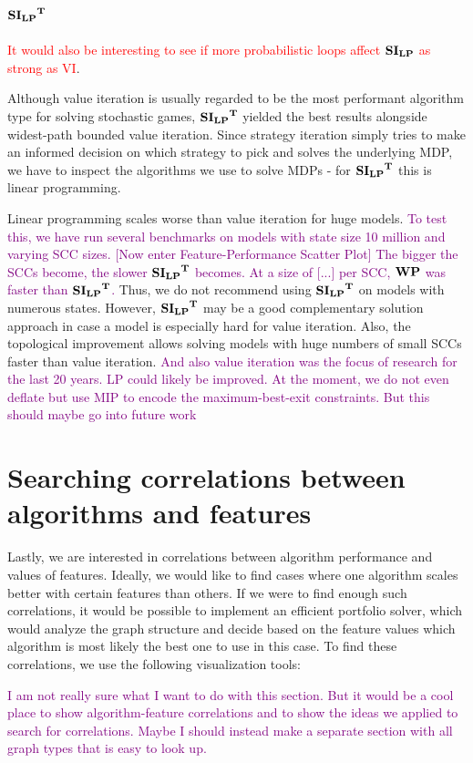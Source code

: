 \subsection{$\mathbf{\mathbf{SI_{LP}}^T}$}
\textcolor{red}{It would also be interesting to see if more probabilistic loops affect $\mathbf{SI_{LP}}$ as strong as VI}.

Although value iteration is usually regarded to be the most performant algorithm type for solving stochastic games, 
$\mathbf{\mathbf{SI_{LP}}^T}$ yielded the best results alongside widest-path bounded value iteration.
Since strategy iteration simply tries to make an informed decision on which strategy to pick and solves the underlying MDP, 
we have to inspect the algorithms we use to solve MDPs - for $\mathbf{\mathbf{SI_{LP}}^T}$ this is linear programming.

Linear programming scales worse than value iteration for huge models. \textcolor{purple}{To test this, we have 
run several benchmarks on models with state size 10 million and varying SCC sizes. [Now enter Feature-Performance Scatter Plot] 
The bigger the SCCs become, the slower $\mathbf{\mathbf{SI_{LP}}^T}$ becomes. At a size of [...] per SCC, $\mathbf{WP}$ was faster than $\mathbf{\mathbf{SI_{LP}}^T}$.}
Thus, we do not recommend using $\mathbf{\mathbf{SI_{LP}}^T}$ on models with numerous states.
However, $\mathbf{\mathbf{SI_{LP}}^T}$ may be a good complementary solution approach in case a model is especially hard for value iteration.
Also, the topological improvement allows solving models with huge numbers of small SCCs faster than value iteration.
\textcolor{purple}{And also value iteration was the focus of research for the last 20 years. 
LP could likely be improved. At the moment, we do not even deflate but use MIP to encode the maximum-best-exit constraints. But this should maybe go into future work}


\section{Searching correlations between algorithms and features}
Lastly, we are interested in correlations between algorithm performance and values of features.
Ideally, we would like to find cases where one algorithm scales better with certain features than others.
If we were to find enough such correlations, it would be possible to implement an efficient portfolio solver, which
would analyze the graph structure and decide based on the feature values which algorithm is most likely the best one to use in this case.
To find these correlations, we use the following visualization tools:

\textcolor{purple}{I am not really sure what I want to do with this section. 
But it would be a cool place to show algorithm-feature correlations and to show the ideas we applied to search for correlations.
Maybe I should instead make a separate section with all graph types that is easy to look up.}

